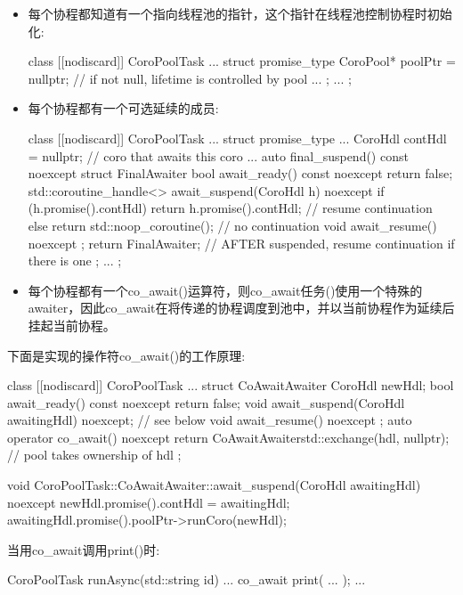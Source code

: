 \begin{itemize}
\item
每个协程都知道有一个指向线程池的指针，这个指针在线程池控制协程时初始化:

\begin{cpp}
class [[nodiscard]] CoroPoolTask
{
	...
	struct promise_type {
		CoroPool* poolPtr = nullptr; // if not null, lifetime is controlled by pool
		...
	};
	...
};
\end{cpp}

\item
每个协程都有一个可选延续的成员:

\begin{cpp}
class [[nodiscard]] CoroPoolTask
{
	...
	struct promise_type {
		...
		CoroHdl contHdl = nullptr; // coro that awaits this coro
		...
		auto final_suspend() const noexcept {
			struct FinalAwaiter {
				bool await_ready() const noexcept { return false; }
				std::coroutine_handle<> await_suspend(CoroHdl h) noexcept {
					if (h.promise().contHdl) {
						return h.promise().contHdl; // resume continuation
					}
					else {
						return std::noop_coroutine(); // no continuation
					}
				}
				void await_resume() noexcept {}
			};
			return FinalAwaiter{}; // AFTER suspended, resume continuation if there is one
		}
	};
	...
};
\end{cpp}

\item
每个协程都有一个co\_await()运算符，则co\_await任务()使用一个特殊的awaiter，因此co\_await在将传递的协程调度到池中，并以当前协程作为延续后挂起当前协程。
\end{itemize}

下面是实现的操作符co\_await()的工作原理:

\begin{cpp}
class [[nodiscard]] CoroPoolTask
{
	...
	struct CoAwaitAwaiter {
		CoroHdl newHdl;
		bool await_ready() const noexcept { return false; }
		void await_suspend(CoroHdl awaitingHdl) noexcept; // see below
		void await_resume() noexcept {}
	};
	auto operator co_await() noexcept {
		return CoAwaitAwaiter{std::exchange(hdl, nullptr)}; // pool takes ownership of hdl
	}
};

void CoroPoolTask::CoAwaitAwaiter::await_suspend(CoroHdl awaitingHdl) noexcept
{
	newHdl.promise().contHdl = awaitingHdl;
	awaitingHdl.promise().poolPtr->runCoro(newHdl);
}
\end{cpp}

当用co\_await调用print()时:

\begin{cpp}
CoroPoolTask runAsync(std::string id)
{
	...
	co_await print( ... );
	...
}
\end{cpp}

